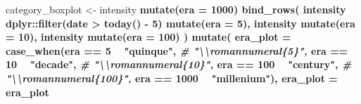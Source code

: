 \documentclass[]{book}
\newenvironment{Shaded}{\begin{snugshade}}{\end{snugshade}}
\newcommand{\CommentTok}[1]{\textcolor[rgb]{0.56,0.35,0.01}{\textit{#1}}}
\newcommand{\DataTypeTok}[1]{\textcolor[rgb]{0.13,0.29,0.53}{#1}}
\newcommand{\DecValTok}[1]{\textcolor[rgb]{0.00,0.00,0.81}{#1}}
\newcommand{\KeywordTok}[1]{\textcolor[rgb]{0.13,0.29,0.53}{\textbf{#1}}}
\newcommand{\NormalTok}[1]{#1}
\newcommand{\OperatorTok}[1]{\textcolor[rgb]{0.81,0.36,0.00}{\textbf{#1}}}
\newcommand{\StringTok}[1]{\textcolor[rgb]{0.31,0.60,0.02}{#1}}
\begin{document}
\begin{Shaded}
\begin{Highlighting}[]
\NormalTok{category_boxplot <-}\StringTok{ }\NormalTok{intensity }\OperatorTok{%>%}
\StringTok{  }\KeywordTok{mutate}\NormalTok{(}\DataTypeTok{era =} \DecValTok{1000}\NormalTok{) }\OperatorTok{%>%}
\StringTok{  }\KeywordTok{bind_rows}\NormalTok{(}
\NormalTok{    intensity }\OperatorTok{%>%}
\StringTok{      }\NormalTok{dplyr}\OperatorTok{::}\KeywordTok{filter}\NormalTok{(date }\OperatorTok{>}\StringTok{ }\KeywordTok{today}\NormalTok{() }\OperatorTok{-}\StringTok{ }\DecValTok{5}\NormalTok{) }\OperatorTok{%>%}
\StringTok{      }\KeywordTok{mutate}\NormalTok{(}\DataTypeTok{era =} \DecValTok{5}\NormalTok{),}
\NormalTok{    intensity }\OperatorTok{%>%}\StringTok{ }\NormalTok{dplyr}\OperatorTok{::}\KeywordTok{filter}\NormalTok{(date }\OperatorTok{>}\StringTok{ }\KeywordTok{today}\NormalTok{() }\OperatorTok{-}\StringTok{ }\DecValTok{10}\NormalTok{) }\OperatorTok{%>%}
\StringTok{      }\KeywordTok{mutate}\NormalTok{(}\DataTypeTok{era =} \DecValTok{10}\NormalTok{),}
\NormalTok{    intensity }\OperatorTok{%>%}\StringTok{ }\NormalTok{dplyr}\OperatorTok{::}\KeywordTok{filter}\NormalTok{(date }\OperatorTok{>}\StringTok{ }\KeywordTok{today}\NormalTok{() }\OperatorTok{-}\StringTok{ }\DecValTok{100}\NormalTok{) }\OperatorTok{%>%}
\StringTok{      }\KeywordTok{mutate}\NormalTok{(}\DataTypeTok{era =} \DecValTok{100}\NormalTok{)}
\NormalTok{  ) }\OperatorTok{%>%}
\StringTok{  }\KeywordTok{mutate}\NormalTok{(}
    \DataTypeTok{era_plot =} \KeywordTok{case_when}\NormalTok{(era }\OperatorTok{==}\StringTok{ }\DecValTok{5} \OperatorTok{~}\StringTok{ "quinque"}\NormalTok{, }\CommentTok{# "\textbackslash{}\textbackslash{}romannumeral\{5\}",}
\NormalTok{                         era }\OperatorTok{==}\StringTok{ }\DecValTok{10} \OperatorTok{~}\StringTok{ "decade"}\NormalTok{,  }\CommentTok{# "\textbackslash{}\textbackslash{}romannumeral\{10\}",}
\NormalTok{                         era }\OperatorTok{==}\StringTok{ }\DecValTok{100} \OperatorTok{~}\StringTok{ "century"}\NormalTok{, }\CommentTok{# "\textbackslash{}\textbackslash{}romannumeral\{100\}",}
\NormalTok{                         era }\OperatorTok{==}\StringTok{ }\DecValTok{1000} \OperatorTok{~}\StringTok{ "millenium"}\NormalTok{),}
    \DataTypeTok{era_plot =}\NormalTok{ era_plot }\OperatorTok{%>%}\StringTok{ }\KeywordTok{as_factor}\NormalTok{(),                         }\DataTypeTok{era_plot =} \KeywordTok{fct_relevel}\NormalTok{(era_plot, }\StringTok{"quinque"}\NormalTok{, }\StringTok{"decade"}\NormalTok{, }\StringTok{"century"}\NormalTok{, }\StringTok{"millenium"}\NormalTok{),}
}}}}}}}}
\end{Highlighting}
\end{Shaded}
\end{document}
